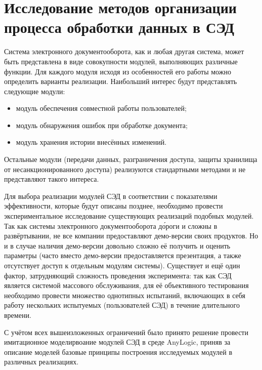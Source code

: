 \section{Исследование методов организации процесса обработки данных в СЭД} \label{experiment}

Система электронного документооборота, как и любая другая система, может быть представлена в виде совокупности модулей, выполняющих различные функции. %
Для каждого модуля исходя из особенностей его работы можно определить варианты реализации. Наибольший интерес будут представлять следующие модули:
\begin{itemize}
	\item модуль обеспечения совместной работы пользователей;
	\item модуль обнаружения ошибок при обработке документа;
	\item модуль хранения истории внесённых изменений.
\end{itemize}
Остальные модули (передачи данных, разграничения доступа, защиты хранилища от несанкционированного доступа) реализуются стандартными методами и не представляют такого интереса.

\vspace{\baselineskip}
Для выбора реализации модулей СЭД в соответствии с показателями эффективности, которые будут описаны позднее, необходимо провести экспериментальное исследование существующих реализаций подобных модулей. Так как системы электронного документооборота д\'{о}роги и сложны в развёртывании, не все компании предоставляют демо-версии своих продуктов. Но и в случае наличия демо-версии довольно сложно её получить и оценить параметры (часто вместо демо-версии предоставляется презентация, а также отсутствует доступ к отдельным модулям системы). Существует и ещё один фактор, затрудняющий сложность проведения эксперимента: так как СЭД является системой массового обслуживания, для её объективного тестирования необходимо провести множество однотипных испытаний, включающих в себя работу нескольких испытуемых (пользователей СЭД) в течение длительного времени.

\vspace{\baselineskip}
С учётом всех вышеизложенных ограничений было принято решение провести имитационное моделирвоание модулей СЭД в среде AnyLogic, приняв за описание моделей базовые принципы построения исследуемых модулей в различных реализациях.

